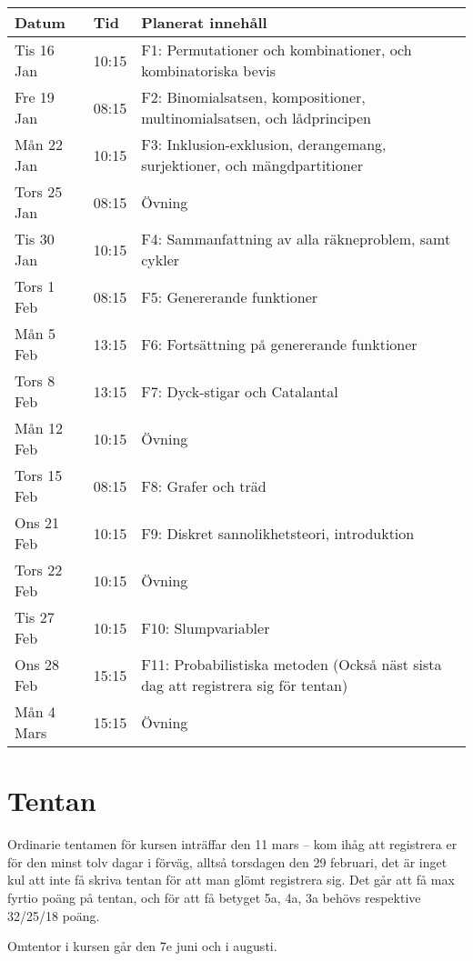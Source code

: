\documentclass{tufte-handout}
\begin{document}
\begin{table}[h]
\begin{tabularx}{\textwidth}{llX}
Datum & Tid      & Planerat innehåll \\ 
\midrule
Tis 16 Jan &10:15 & F1: Permutationer och kombinationer, och kombinatoriska bevis\\
Fre 19 Jan &08:15 & F2: Binomialsatsen, kompositioner, multinomialsatsen, och lådprincipen\\
Mån 22 Jan &10:15 & F3: Inklusion-exklusion, derangemang, surjektioner, och mängdpartitioner\\
Tors 25 Jan &08:15 & Övning\\
Tis 30 Jan &10:15 & F4: Sammanfattning av alla räkneproblem, samt cykler\\
Tors 1 Feb &08:15 & F5: Genererande funktioner\\
Mån 5 Feb &13:15 & F6: Fortsättning på genererande funktioner\\
Tors 8 Feb &13:15 & F7: Dyck-stigar och Catalantal\\
Mån 12 Feb &10:15 & Övning\\
Tors 15 Feb &08:15 & F8: Grafer och träd\\
Ons 21 Feb &10:15 & F9: Diskret sannolikhetsteori, introduktion\\
Tors 22 Feb &10:15 & Övning\\
Tis 27 Feb &10:15 & F10: Slumpvariabler\\
Ons 28 Feb &15:15 & F11: Probabilistiska metoden (Också näst sista dag att registrera sig för tentan)\\
Mån 4 Mars &15:15 & Övning
\end{tabularx}
\end{table}

\section{Tentan}

Ordinarie tentamen för kursen inträffar den 11 mars -- kom ihåg att registrera er för den minst tolv dagar i förväg, alltså torsdagen den 29 februari, det är inget kul att inte få skriva tentan för att man glömt registrera sig. Det går att få max fyrtio poäng på tentan, och för att få betyget 5a, 4a, 3a behövs respektive 32/25/18 poäng.

Omtentor i kursen går den 7e juni och i augusti.
\end{document}
